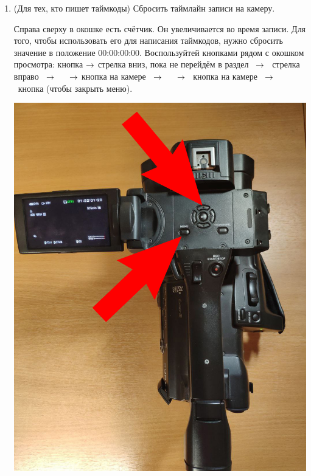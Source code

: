 \begin{enumerate}
  \item (Для тех, кто пишет таймкоды) Сбросить таймлайн записи на камеру.
        \par Справа сверху в окошке есть счётчик. Он увеличивается во время записи. Для того, чтобы использовать его для написания таймкодов, нужно сбросить значение в положение 00:00:00:00. Воспользуйтей кнопками рядом с окошком просмотра: кнопка  $\rightarrow$ стрелка вниз, пока не перейдём в раздел  \ $\rightarrow$ \ стрелка вправо \ $\rightarrow$ \  \ $\rightarrow$ кнопка  на камере \ $\rightarrow$ \  \ $\rightarrow$ \ кнопка  на камере \ $\rightarrow$ \ кнопка  (чтобы закрыть меню).

        \begin{minipage}[c]{0.4\textwidth}
          \includegraphics[width=\textwidth]{Images/PortableCamera/tripod/step9-1-view-from-above.jpg}
        \end{minipage}
        \hfill
        \begin{minipage}[c]{0.51\textwidth}

\end{minipage}
\end{enumerate}
